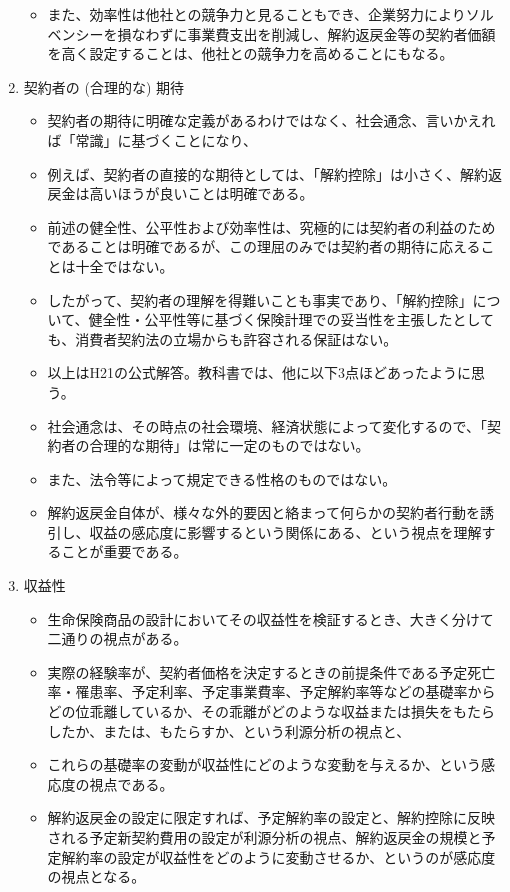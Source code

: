 \documentclass[report,gutter=10mm,fore-edge=10mm,uplatex,dvipdfmx]{jlreq}
\begin{document}
\begin{enumerate}
\begin{itemize}
  \item また、効率性は他社との競争力と見ることもでき、企業努力によりソルベンシーを損なわずに事業費支出を削減し、解約返戻金等の契約者価額を高く設定することは、他社との競争力を高めることにもなる。
  \end{itemize}
\item 契約者の (合理的な) 期待
  \begin{itemize}
  \item 契約者の期待に明確な定義があるわけではなく、社会通念、言いかえれば「常識」に基づくことになり、
  \item 例えば、契約者の直接的な期待としては、「解約控除」は小さく、解約返戻金は高いほうが良いことは明確である。
  \item 前述の健全性、公平性および効率性は、究極的には契約者の利益のためであることは明確であるが、この理屈のみでは契約者の期待に応えることは十全ではない。
  \item したがって、契約者の理解を得難いことも事実であり、「解約控除」について、健全性・公平性等に基づく保険計理での妥当性を主張したとしても、消費者契約法の立場からも許容される保証はない。
  \item 以上はH21の公式解答。教科書では、他に以下3点ほどあったように思う。
  \item 社会通念は、その時点の社会環境、経済状態によって変化するので、「契約者の合理的な期待」は常に一定のものではない。
  \item また、法令等によって規定できる性格のものではない。
  \item 解約返戻金自体が、様々な外的要因と絡まって何らかの契約者行動を誘引し、収益の感応度に影響するという関係にある、という視点を理解することが重要である。
  \end{itemize}
\item 収益性
  \begin{itemize}
  \item 生命保険商品の設計においてその収益性を検証するとき、大きく分けて二通りの視点がある。
  \item 実際の経験率が、契約者価格を決定するときの前提条件である予定死亡率・罹患率、予定利率、予定事業費率、予定解約率等などの基礎率からどの位乖離しているか、その乖離がどのような収益または損失をもたらしたか、または、もたらすか、という利源分析の視点と、
  \item これらの基礎率の変動が収益性にどのような変動を与えるか、という感応度の視点である。
  \item 解約返戻金の設定に限定すれば、予定解約率の設定と、解約控除に反映される予定新契約費用の設定が利源分析の視点、解約返戻金の規模と予定解約率の設定が収益性をどのように変動させるか、というのが感応度の視点となる。

\end{itemize}
\end{enumerate}
\end{document}
